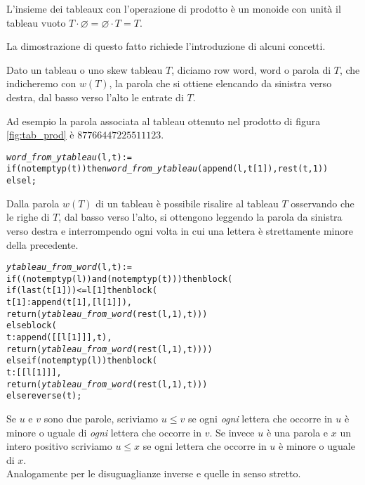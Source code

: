 \begin{prop}\label{tableaux_monoid}
L'insieme dei tableaux con l'operazione di prodotto \`e un monoide con
unit\`a il tableau vuoto $T \cdot \varnothing = \varnothing \cdot T = T$.
\end{prop}

La dimostrazione di questo fatto richiede l'introduzione di alcuni
concetti.

\begin{defn}[Parola]
Dato un tableau o uno skew tableau $T$, diciamo row word, word o parola
di $T$, che indicheremo con $w(T)$, la parola che si ottiene elencando
da sinistra verso destra, dal basso verso l'alto le entrate di $T$.
\end{defn}

Ad esempio la parola associata al tableau ottenuto nel prodotto di
figura \ref{fig:tab_prod} \`e $87766447225511123$.

\begin{alltt}
\emph{word\_from\_ytableau} (l, t) :=
if (not emptyp (t)) then \emph{word\_from\_ytableau} (append (l, t[1]), rest (t, 1))
else l;
\end{alltt}

\begin{oss}
Dalla parola $w(T)$ di un tableau \`e possibile risalire al tableau
$T$ osservando che le righe di $T$, dal basso verso l'alto, si
ottengono leggendo la parola da sinistra verso destra e interrompendo
ogni volta in cui una lettera \`e strettamente minore della
precedente.
\begin{alltt}
\emph{ytableau\_from\_word} (l,t) :=
if ((not emptyp (l)) and (not emptyp (t))) then block (
  if (last (t[1])) <= l[1] then block (
    t[1] : append (t[1], [l[1]]),
    return (\emph{ytableau\_from\_word} (rest (l, 1), t)))
  else block (
    t : append ([[l[1]]], t),
    return (\emph{ytableau\_from\_word} (rest (l, 1), t))))
else if (not emptyp (l)) then block (
  t : [[l[1]]],
  return (\emph{ytableau\_from\_word} (rest (l, 1), t)))
else reverse (t);
\end{alltt}
\end{oss}

\begin{notaz}
Se $u$ e $v$ sono due parole, scriviamo $u \leq v$ se ogni
\emph{ogni} lettera che occorre in $u$ \`e minore o uguale di \emph{ogni} lettera
che occorre in $v$. Se invece $u$ \`e una parola e $x$ un intero
positivo scriviamo $u \leq x$ se ogni lettera che occorre in $u$ \`e
minore o uguale di $x$.\\
Analogamente per le disuguaglianze inverse e quelle in senso stretto. 
\end{notaz}

